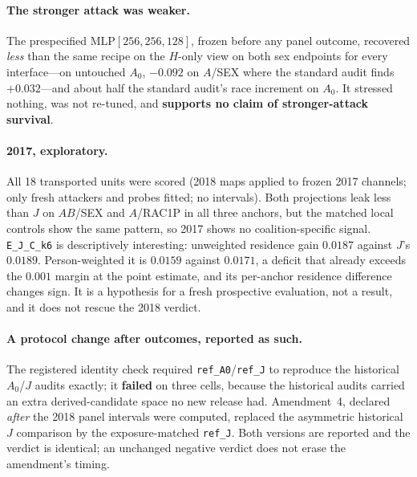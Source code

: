 \documentclass[10pt]{article}
\begin{document}
\paragraph{The stronger attack was weaker.} The prespecified $\mathrm{MLP}[256,256,128]$, frozen before any
panel outcome, recovered \emph{less} than the same recipe on the $H$-only view on both sex endpoints for every
interface---on untouched $A_0$, $-0.092$ on $A$/SEX where the standard audit finds $+0.032$---and about half
the standard audit's race increment on $A_0$. It stressed nothing, was not re-tuned, and \textbf{supports no
claim of stronger-attack survival}.

\paragraph{2017, exploratory.} All 18 transported units were scored (2018 maps applied to frozen 2017
channels; only fresh attackers and probes fitted; no intervals). Both projections leak less than $J$ on
$AB$/SEX and $A$/RAC1P in all three anchors, but the matched local controls show the same pattern, so 2017
shows no coalition-specific signal. \texttt{E\_J\_C\_k6} is descriptively interesting: unweighted residence
gain $0.0187$ against $J$'s $0.0189$. Person-weighted it is $0.0159$ against $0.0171$, a deficit that already
exceeds the $0.001$ margin at the point estimate, and its per-anchor residence difference changes sign.
It is a hypothesis for a fresh prospective evaluation, not a result, and it does not rescue the 2018
verdict.

\paragraph{A protocol change after outcomes, reported as such.} The registered identity check required
\texttt{ref\_A0}/\texttt{ref\_J} to reproduce the historical $A_0$/$J$ audits exactly; it \textbf{failed} on
three cells, because the historical audits carried an extra derived-candidate space no new release had.
Amendment~4, declared \emph{after} the 2018 panel intervals were computed, replaced the asymmetric historical
$J$ comparison by the exposure-matched \texttt{ref\_J}. Both versions are reported and the verdict is identical;
an unchanged negative verdict does not erase the amendment's timing.
\end{document}
